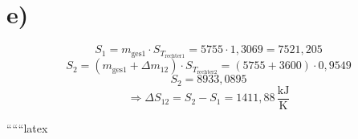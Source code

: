 

\section*{e)}
\[
S_1 = m_{\text{ges}1} \cdot S_{T_{\text{rechter}1}} = 5755 \cdot 1{,}3069 = 7521{,}205
\]
\[
S_2 = (m_{\text{ges}1} + \Delta m_{12}) \cdot S_{T_{\text{rechter}2}} = (5755 + 3600) \cdot 0{,}9549
\]
\[
S_2 = 8933{,}0895
\]
\[
\Rightarrow \Delta S_{12} = S_2 - S_1 = 1411{,}88 \, \frac{\text{kJ}}{\text{K}}
\]

``````latex